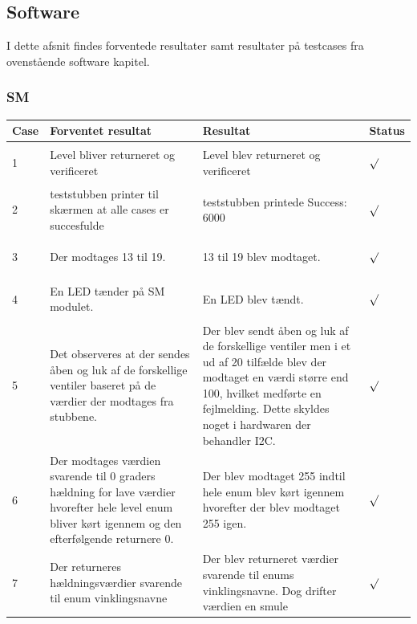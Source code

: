 \subsection{Software}
I dette afsnit findes forventede resultater samt resultater på testcases fra ovenstående software kapitel.\\
\subsubsection{SM}
\begin{table}[H]
\centering
\begin{tabular}{| p{1cm}  | p{4cm} | p{6cm} | p{1cm} |}
\hline
Case &Forventet resultat &Resultat &Status\\\hline
1 &Level bliver returneret og verificeret &Level blev returneret og verificeret &\begin{Huge}$\surd$\end{Huge} \\\hline 
2 &teststubben printer til skærmen at alle cases er succesfulde &teststubben printede Success: 6000 &\begin{Huge}$\surd$\end{Huge} \\\hline
3 &Der modtages 13 til 19. &13 til 19 blev modtaget. &\begin{Huge}$\surd$\end{Huge} \\\hline
4 &En LED tænder på SM modulet. &En LED blev tændt. &\begin{Huge}$\surd$\end{Huge} \\\hline
5 &Det observeres at der sendes åben og luk af de forskellige ventiler baseret på de værdier der modtages fra stubbene. &Der blev sendt åben og luk af de forskellige ventiler men i et ud af 20 tilfælde blev der modtaget en værdi større end 100, hvilket medførte en fejlmelding. Dette skyldes noget i hardwaren der behandler I2C. &\begin{Huge}$\surd$\end{Huge} \\\hline
6 &Der modtages værdien svarende til 0 graders hældning for lave værdier hvorefter hele level enum bliver kørt igennem og den efterfølgende returnere 0. &Der blev modtaget 255 indtil hele enum blev kørt igennem hvorefter der blev modtaget 255 igen. &\begin{Huge}$\surd$\end{Huge} \\\hline
7 &Der returneres hældningsværdier svarende til enum vinklingsnavne &Der blev returneret værdier svarende til enums vinklingsnavne. Dog drifter værdien en smule&\begin{Huge}$\surd$\end{Huge} \\\hline
\end{tabular}
\end{table}

